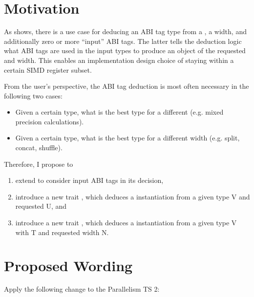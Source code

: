 \section{Motivation}
As \textcite{P0820R1} shows, there is a use case for deducing an ABI tag type from a , a width, and additionally zero or more “input” ABI tags.
The latter tells the deduction logic what ABI tags are used in the input types to produce an object of the requested  and width.
This enables an implementation design choice of staying within a certain SIMD register subset.

From the user's perspective, the ABI tag deduction is most often necessary in the following two cases:
\begin{itemize}
  \item Given a certain  type, what is the best  type for a different  (e.g. mixed precision calculations).
  \item Given a certain  type, what is the best  type for a different width (e.g. split, concat, shuffle).
\end{itemize}
Therefore, I propose to
\begin{enumerate}
  \item extend  to consider input ABI tags in its decision,
  \item introduce a new trait , which deduces a \simd[<U, Abi>] instantiation from a given \simd type \type V and requested  \type U, and
  \item introduce a new trait , which deduces a \simd[<T, Abi>] instantiation from a given \simd type \type V with  \type T and requested width \code N.
\end{enumerate}

\section{Proposed Wording}

Apply the following change to the Parallelism TS 2:
\begin{wgText}
  \begingroup
    \ttfamily\smaller[1]
    \\
    \\
    \\
    \\
  \endgroup
\end{wgText}

